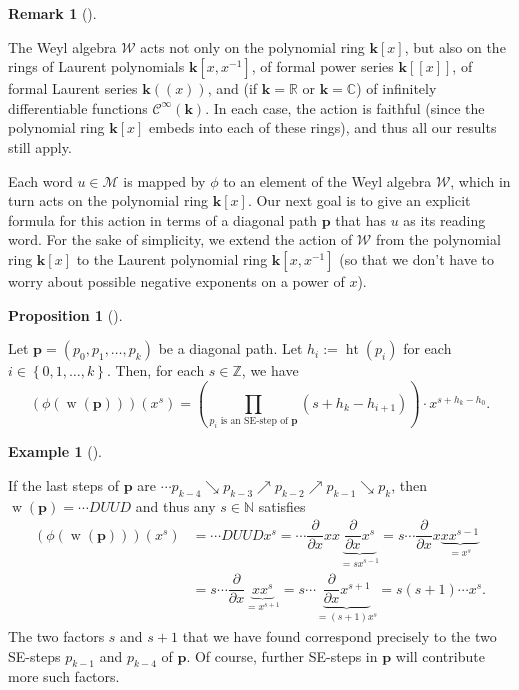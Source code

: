 \documentclass[numbers=enddot,12pt,final,onecolumn,notitlepage]{scrartcl}%
\theoremstyle{definition}
\newtheorem{prop}[theo]{Proposition}
\newenvironment{proposition}[1][]
{\begin{prop}[#1]\begin{leftbar}}
{\end{leftbar}\end{prop}}
\newtheorem{remk}[theo]{Remark}
\newenvironment{remark}[1][]
{\begin{remk}[#1]\begin{leftbar}}
{\end{leftbar}\end{remk}}
\newtheorem{exam}[theo]{Example}
\newenvironment{example}[1][]
{\begin{exam}[#1]\begin{leftbar}}
{\end{leftbar}\end{exam}}
\newcommand{\W}{\mathcal{W}}
\newcommand{\M}{\mathcal{M}}
\newcommand{\kk}{\mathbf{k}}
\newcommand{\CC}{\mathbb{C}}
\newcommand{\NN}{\mathbb{N}}
\newcommand{\ZZ}{\mathbb{Z}}
\newcommand{\RR}{\mathbb{R}}
\newcommand{\pp}{\mathbf{p}}
\newcommand{\w}{\operatorname{w}}
\newcommand{\htt}{\operatorname{ht}}
\begin{document}
\begin{remark}
The Weyl algebra $\W$ acts not only on the polynomial ring $\kk\left[x\right]$, but also on the rings of Laurent polynomials $\kk\left[x,x^{-1}\right]$, of formal power series $\kk\left[\left[x\right]\right]$, of formal Laurent series $\kk\left(\left(x\right)\right)$, and (if $\kk = \RR$ or $\kk = \CC$) of infinitely differentiable functions $\mathcal{C}^\infty\left(\kk\right)$.
In each case, the action is faithful (since the polynomial ring $\kk\left[x\right]$ embeds into each of these rings),
and thus all our results still apply.
\end{remark}

Each word $u\in\M$ is mapped by $\phi$ to an element of the Weyl
algebra $\W$, which in turn acts on the polynomial ring
$\kk\left[  x\right]  $. Our next goal is to give an explicit formula
for this action in terms of a diagonal path $\pp$ that has $u$ as its
reading word. For the sake of simplicity, we extend the action of
$\W$ from the polynomial ring $\kk\left[  x\right]  $ to the
Laurent polynomial ring $\kk\left[  x,x^{-1}\right]  $ (so that we
don't have to worry about possible negative exponents on a power of $x$).

\begin{proposition}
\label{prop.UD-act} Let $\pp=\left(  p_{0},p_{1},\ldots,p_{k}\right)  $
be a diagonal path. Let $h_{i}:=\htt\left(  p_{i}\right)  $ for
each $i\in\left\{  0,1,\ldots,k\right\}  $. Then, for each $s\in\ZZ$,
we have%
\begin{equation}
 \left(  \phi\left(  \w\left(  \pp\right)  \right)
\right)  \left(  x^{s}\right)
= \left(  \prod_{p_{i}\text{ is an SE-step of }\pp}\left(
s+h_{k}-h_{i+1}\right)  \right)  \cdot x^{s+h_{k}-h_{0}}.
\label{eq.prop.UD-act.1}%
\end{equation}

\end{proposition}

\begin{example}
If the last steps of $\pp$ are
$\cdots p_{k-4}\searrow p_{k-3}\nearrow p_{k-2}\nearrow p_{k-1}\searrow p_{k}$,
then $\w\left(
\pp\right)  =\cdots DUUD$ and thus any $s\in\NN$ satisfies
\begin{align*}
\left(  \phi\left(  \w\left(  \pp\right)  \right)
\right)  \left(  x^{s}\right)   &  =\cdots DUUDx^{s}=\cdots\dfrac{\partial
}{\partial x}xx\underbrace{\dfrac{\partial}{\partial x}x^{s}}_{=sx^{s-1}%
}=s\cdots\dfrac{\partial}{\partial x}x\underbrace{xx^{s-1}}_{=x^{s}}\\
&  =s\cdots\dfrac{\partial}{\partial x}\underbrace{xx^{s}}_{=x^{s+1}}%
=s\cdots\underbrace{\dfrac{\partial}{\partial x}x^{s+1}}_{=\left(  s+1\right)
x^{s}}=s\left(  s+1\right)  \cdots x^{s}.
\end{align*}
The two factors $s$ and $s+1$ that we have found correspond precisely to the
two SE-steps $p_{k-1}$ and $p_{k-4}$ of $\pp$. Of course, further
SE-steps in $\pp$ will contribute more such factors.
\end{example}
\end{document}

